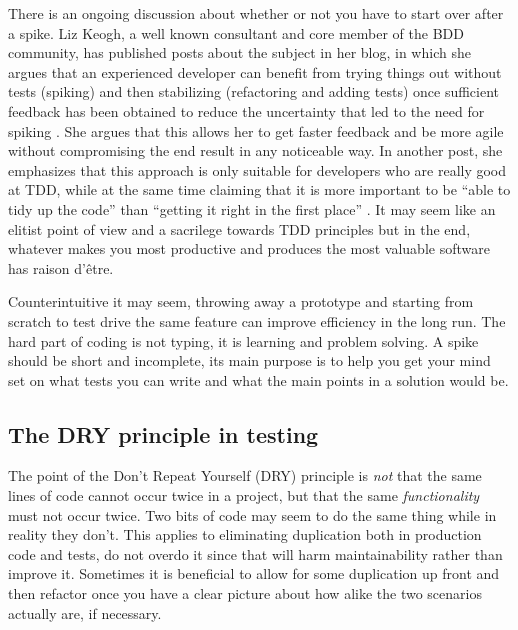\documentclass[11pt]{article}
\begin{document}
There is an ongoing discussion about whether or not you have to start over after a spike. Liz Keogh, a well known consultant and core member of the BDD community, has published posts about the subject in her blog, in which she argues that an experienced developer can benefit from trying things out without tests (spiking) and then stabilizing (refactoring and adding tests) once sufficient feedback has been obtained to reduce the uncertainty that led to the need for spiking \cite{Liz1}. She argues that this allows her to get faster feedback and be more agile without compromising the end result in any noticeable way. In another post, she emphasizes that this approach is only suitable for developers who are really good at TDD, while at the same time claiming that it is more important to be ``able to tidy up the code'' than ``getting it right in the first place'' \cite{Liz2}. It may seem like an elitist point of view and a sacrilege towards TDD principles but in the end, whatever makes you most productive and produces the most valuable software has raison d'être.

Counterintuitive it may seem, throwing away a prototype and starting from scratch to test drive the same feature can improve efficiency in the long run. The hard part of coding is not typing, it is learning and problem solving. A spike should be short and incomplete, its main purpose is to help you get your mind set on what tests you can write and what the main points in a solution would be. \cite[question~60]{Edelstam}

\subsection{The DRY principle in testing}

The point of the Don't Repeat Yourself (DRY) principle is \emph{not} that the same lines of code cannot occur twice in a project, but that the same \emph{functionality} must not occur twice. Two bits of code may seem to do the same thing while in reality they don't. This applies to eliminating duplication both in production code and tests, do not overdo it since that will harm maintainability rather than improve it. Sometimes it is beneficial to allow for some duplication up front and then refactor once you have a clear picture about how alike the two scenarios actually are, if necessary. \cite[questions~69-70]{Edelstam}

\printbibliography
\end{document}
